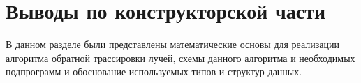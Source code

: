 \section{Выводы по конструкторской части}
В данном разделе были представлены математические основы для реализации алгоритма обратной трассировки лучей, схемы данного алгоритма и необходимых подпрограмм и обоснование используемых типов и структур данных.

\newpage